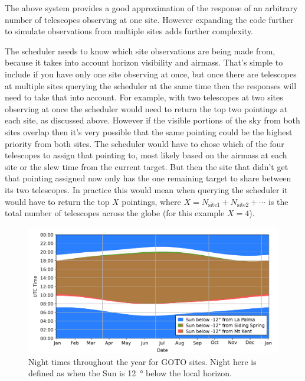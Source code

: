 \begin{colsection}
\begin{colsection}
The above system provides a good approximation of the response of an arbitrary number of telescopes observing at one site. However expanding the code further to simulate observations from multiple sites adds further complexity.

The scheduler needs to know which site observations are being made from, because it takes into account horizon visibility and airmass. That's simple to include if you have only one site observing at once, but once there are telescopes at multiple sites querying the scheduler at the same time then the responses will need to take that into account. For example, with two telescopes at two sites observing at once the scheduler would need to return the top two pointings at each site, as discussed above. However if the visible portions of the sky from both sites overlap then it's very possible that the same pointing could be the highest priority from both sites. The scheduler would have to chose which of the four telescopes to assign that pointing to, most likely based on the airmass at each site or the slew time from the current target. But then the site that didn't get that pointing assigned now only has the one remaining target to share between its two telescopes. In practice this would mean when querying the scheduler it would have to return the top $X$ pointings, where $X = N_\text{site1} + N_\text{site2} + \cdots$ is the total number of telescopes across the globe (for this example $X=4$).

\begin{figure}[t]
    \begin{center}
        \includegraphics[width=\linewidth]{images/nights.pdf}
    \end{center}
    \caption[Night times throughout the year for GOTO sites]{
        Night times throughout the year for GOTO sites. Night here is defined as when the Sun is \SI{12}{\degree} below the local horizon.
    }\label{fig:nights}
\end{figure}


\end{colsection}
\end{colsection}

